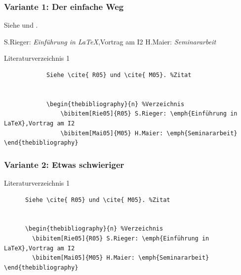 \begin{frame}[fragile]
	\frametitle{Variante 1: Der einfache Weg}

  \begin{example}
  Siehe \cite{ R05} und \cite{ M05}. %


      \begin{thebibliography}{n} %
         S.Rieger: \emph{Einführung in
LaTeX},Vortrag am I2
         H.Maier: \emph{Seminararbeit}
\end{thebibliography}
  \end{example}
  \pause
	\begin{block}{Literaturverzeichnis 1}
		\begin{verbatim}
			Siehe \cite{ R05} und \cite{ M05}. %Zitat


			\begin{thebibliography}{n} %Verzeichnis
 				\bibitem[Rie05]{R05} S.Rieger: \emph{Einführung in
LaTeX},Vortrag am I2
 				\bibitem[Mai05]{M05} H.Maier: \emph{Seminararbeit}
\end{thebibliography}
		\end{verbatim}
	\end{block}
\end{frame}



\begin{frame}[fragile]
  \frametitle{Variante 2: Etwas schwieriger}

  \begin{block}{Literaturverzeichnis 1}
    \begin{verbatim}
      Siehe \cite{ R05} und \cite{ M05}. %Zitat


      \begin{thebibliography}{n} %Verzeichnis
        \bibitem[Rie05]{R05} S.Rieger: \emph{Einführung in
LaTeX},Vortrag am I2
        \bibitem[Mai05]{M05} H.Maier: \emph{Seminararbeit}
\end{thebibliography}
    \end{verbatim}
  \end{block}
\end{frame}

